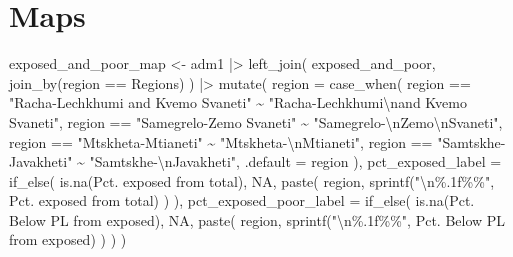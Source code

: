 \documentclass[
  letterpaper,
  DIV=11,
  numbers=noendperiod]{scrartcl}
\newenvironment{Shaded}{}{}
\newcommand{\AttributeTok}[1]{\textcolor[rgb]{0.84,0.23,0.29}{#1}}
\newcommand{\ConstantTok}[1]{\textcolor[rgb]{0.00,0.36,0.77}{#1}}
\newcommand{\FunctionTok}[1]{\textcolor[rgb]{0.44,0.26,0.76}{#1}}
\newcommand{\NormalTok}[1]{\textcolor[rgb]{0.14,0.16,0.18}{#1}}
\newcommand{\OtherTok}[1]{\textcolor[rgb]{0.44,0.26,0.76}{#1}}
\newcommand{\SpecialCharTok}[1]{\textcolor[rgb]{0.00,0.36,0.77}{#1}}
\newcommand{\StringTok}[1]{\textcolor[rgb]{0.01,0.18,0.38}{#1}}
\begin{document}
\section{Maps}\label{maps}

\begin{Shaded}
\begin{Highlighting}[]
\NormalTok{exposed\_and\_poor\_map }\OtherTok{\textless{}{-}}\NormalTok{ adm1 }\SpecialCharTok{|\textgreater{}} 
  \FunctionTok{left\_join}\NormalTok{(}
\NormalTok{    exposed\_and\_poor,}
    \FunctionTok{join\_by}\NormalTok{(region }\SpecialCharTok{==}\NormalTok{ Regions)}
\NormalTok{  ) }\SpecialCharTok{|\textgreater{}} 
  \FunctionTok{mutate}\NormalTok{(}
    \AttributeTok{region =} \FunctionTok{case\_when}\NormalTok{(}
\NormalTok{      region }\SpecialCharTok{==} \StringTok{"Racha{-}Lechkhumi and Kvemo Svaneti"} \SpecialCharTok{\textasciitilde{}}
      \StringTok{"Racha{-}Lechkhumi}\SpecialCharTok{\textbackslash{}n}\StringTok{and Kvemo Svaneti"}\NormalTok{,}
\NormalTok{      region }\SpecialCharTok{==} \StringTok{"Samegrelo{-}Zemo Svaneti"} \SpecialCharTok{\textasciitilde{}}
      \StringTok{"Samegrelo{-}}\SpecialCharTok{\textbackslash{}n}\StringTok{Zemo}\SpecialCharTok{\textbackslash{}n}\StringTok{Svaneti"}\NormalTok{,}
\NormalTok{      region }\SpecialCharTok{==} \StringTok{"Mtskheta{-}Mtianeti"} \SpecialCharTok{\textasciitilde{}}
      \StringTok{"Mtskheta{-}}\SpecialCharTok{\textbackslash{}n}\StringTok{Mtianeti"}\NormalTok{,}
\NormalTok{      region }\SpecialCharTok{==} \StringTok{"Samtskhe{-}Javakheti"} \SpecialCharTok{\textasciitilde{}}
      \StringTok{"Samtskhe{-}}\SpecialCharTok{\textbackslash{}n}\StringTok{Javakheti"}\NormalTok{,}
      \AttributeTok{.default =}\NormalTok{ region}
\NormalTok{    ),}
    \AttributeTok{pct\_exposed\_label =} \FunctionTok{if\_else}\NormalTok{(}
      \FunctionTok{is.na}\NormalTok{(}\StringTok{\textasciigrave{}}\AttributeTok{Pct. exposed from total}\StringTok{\textasciigrave{}}\NormalTok{), }
      \ConstantTok{NA}\NormalTok{, }
      \FunctionTok{paste}\NormalTok{(}
\NormalTok{        region,}
        \FunctionTok{sprintf}\NormalTok{(}\StringTok{"}\SpecialCharTok{\textbackslash{}n}\StringTok{\%.1f\%\%"}\NormalTok{, }\StringTok{\textasciigrave{}}\AttributeTok{Pct. exposed from total}\StringTok{\textasciigrave{}}\NormalTok{)}
\NormalTok{      ) }
\NormalTok{    ),}
    \AttributeTok{pct\_exposed\_poor\_label =} \FunctionTok{if\_else}\NormalTok{(}
      \FunctionTok{is.na}\NormalTok{(}\StringTok{\textasciigrave{}}\AttributeTok{Pct. Below PL from exposed}\StringTok{\textasciigrave{}}\NormalTok{), }
      \ConstantTok{NA}\NormalTok{,}
      \FunctionTok{paste}\NormalTok{(}
\NormalTok{        region,}
        \FunctionTok{sprintf}\NormalTok{(}\StringTok{"}\SpecialCharTok{\textbackslash{}n}\StringTok{\%.1f\%\%"}\NormalTok{, }\StringTok{\textasciigrave{}}\AttributeTok{Pct. Below PL from exposed}\StringTok{\textasciigrave{}}\NormalTok{)}
\NormalTok{      )}
\NormalTok{    )}
\NormalTok{  )}
\end{Highlighting}
\end{Shaded}
\end{document}
